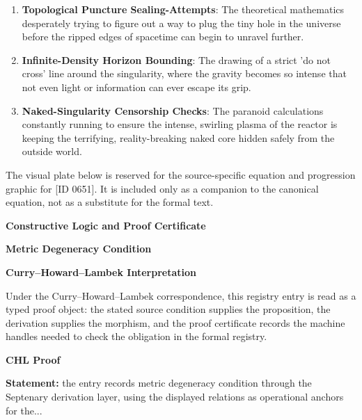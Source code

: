 \begin{enumerate}[leftmargin=1.6em,itemsep=6pt,topsep=4pt]
\item \textbf{Topological Puncture Sealing-Attempts}: The theoretical mathematics desperately trying to figure out a way to plug the tiny hole in the universe before the ripped edges of spacetime can begin to unravel further.
\item \textbf{Infinite-Density Horizon Bounding}: The drawing of a strict 'do not cross' line around the singularity, where the gravity becomes so intense that not even light or information can ever escape its grip.
\item \textbf{Naked-Singularity Censorship Checks}: The paranoid calculations constantly running to ensure the intense, swirling plasma of the reactor is keeping the terrifying, reality-breaking naked core hidden safely from the outside world.
\end{enumerate}

\begingroup\footnotesize\sloppy
The visual plate below is reserved for the source-specific equation and progression graphic for [ID 0651]. It is included only as a companion to the canonical equation, not as a substitute for the formal text.
\par\endgroup
\ifTZPDarkEdition
{}
\fi

\clearpage
\begingroup\tzpsupportsetup
\noindent\textbf{\fontsize{10.8pt}{12.8pt}\selectfont [ID 0651] Constructive Logic and Proof Certificate}\par
\noindent\textbf{\fontsize{10pt}{12pt}\selectfont Metric Degeneracy Condition}\par
\vspace{0.45em}
\begingroup
\footnotesize
\setlength{\parskip}{0.22em}
\setlength{\parindent}{0pt}
\noindent\textbf{Curry--Howard--Lambek Interpretation}\par
Under the Curry--Howard--Lambek correspondence, this registry entry is read as a typed proof
object: the stated source condition supplies the proposition, the derivation supplies the
morphism, and the proof certificate records the machine handles needed to check the obligation
in the formal registry.

\vspace{0.45em}
\noindent\textbf{CHL Proof}\par
\textbf{Statement:} the entry records metric degeneracy condition through the Septenary derivation layer,
using the displayed relations as operational anchors for the...

